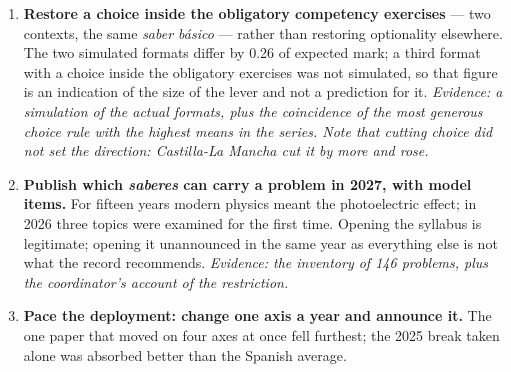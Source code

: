 \documentclass[
  10.5pt,
  a4paper,
  DIV=11,
  numbers=noendperiod]{scrartcl}
\newcounter{none} %
\begin{document}
\begin{enumerate}
  prices, both of which exist because the marking is itemised into
  quanta of 0.25 and printed on the paper. Four routes, three of which
  this dossier can price in words and none in marks: compress the
  narrative (there is not 470 words of slack in it); flatten two levels
  of demand back to one (cheapest, and it returns partial credit to the
  corrector's discretion); itemise in the criteria as now but print only
  the apartado and its total (the only route that separates the reading
  cost from the protection, and nobody has tested whether candidates use
  the printed weights); or leave the length alone and cap the deductions
  instead, which is item 8. \emph{Evidence: the strongest
  cross-community association in the study by a short head
  (\(r = -0.905\) against \(-0.86\) for contextualised points), and the
  weakest causally --- it is post-hoc, collinear with competency
  content, and leveraged by the Basque paper itself. The decomposition
  of the statement, by contrast, is a direct measurement of the Basque
  papers themselves and is corroborated independently by the
  coordination's own reconstruction, which prices the itemisation step
  at 66 words on one problem.}
\item
  \textbf{Restore a choice inside the obligatory competency exercises}
  --- two contexts, the same \emph{saber básico} --- rather than
  restoring optionality elsewhere. The two simulated formats differ by
  0.26 of expected mark; a third format with a choice inside the
  obligatory exercises was not simulated, so that figure is an
  indication of the size of the lever and not a prediction for it.
  \emph{Evidence: a simulation of the actual formats, plus the
  coincidence of the most generous choice rule with the highest means in
  the series. Note that cutting choice did not set the direction:
  Castilla-La Mancha cut it by more and rose.}
\item
  \textbf{Publish which \emph{saberes} can carry a problem in 2027, with
  model items.} For fifteen years modern physics meant the photoelectric
  effect; in 2026 three topics were examined for the first time. Opening
  the syllabus is legitimate; opening it unannounced in the same year as
  everything else is not what the record recommends. \emph{Evidence: the
  inventory of 146 problems, plus the coordinator's account of the
  restriction.}
\item
  \textbf{Pace the deployment: change one axis a year and announce it.}
  The one paper that moved on four axes at once fell furthest; the 2025
  break taken alone was absorbed better than the Spanish average.

\end{enumerate}
\end{document}
